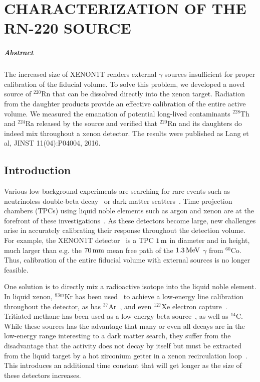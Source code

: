 
\chapter{CHARACTERIZATION OF THE RN-220 SOURCE}\label{ch:rn220}

\paragraph{Abstract} The increased size of XENON1T renders external $\gamma$ sources insufficient for proper calibration of the fiducial volume. To solve this problem, we developed a novel source of $^{220}$Rn that can be dissolved directly into the xenon target. Radiation from the daughter products provide an effective calibration of the entire active volume. We measured the emanation of potential long-lived contaminants $^{228}$Th and $^{224}$Ra released by the source and verified that $^{220}$Rn and its daughters do indeed mix throughout a xenon detector. The results were published as Lang et al, JINST 11(04):P04004, 2016.

\section{Introduction}

Various low-background experiments are searching for rare events such as neutrinoless double-beta decay~\cite{Pandola:2014naa} or dark matter scatters~\cite{Undagoitia:2015gya}. Time projection chambers (TPCs) using liquid noble elements such as argon and xenon are at the forefront of these investigations~\cite{Albert:2015eem,Aprile:2015uzo,Akerib:2015rjg,Amaudruz:2014nsa,Calvo:2015uln,Agnes:2015ftt}. As these detectors become large, new challenges arise in accurately calibrating their response throughout the detection volume. For example, the XENON1T detector~\cite{Aprile:2015uzo} is a TPC $1\,\mathrm{m}$ in diameter and in height, much larger than e.g. the $70\,\mathrm{mm}$ mean free path of the $1.3\,\mathrm{MeV}$ $\gamma$ from $^{60}$Co. Thus, calibration of the entire fiducial volume with external sources is no longer feasible.

One solution is to directly mix a radioactive isotope into the liquid noble element. In liquid xenon, $^{83m}$Kr has been used~\cite{Akerib:2017eql} to achieve a low-energy line calibration throughout the detector, as has $^{37}$Ar~\cite{Boulton:2017hub}, and even $^{127}$Xe electron capture~\cite{Akerib:2017hph}. Tritiated methane has been used as a low-energy beta source~\cite{Akerib:2015wdi}, as well as $^{14}$C. While these sources has the advantage that many or even all decays are in the low-energy range interesting to a dark matter search, they suffer from the disadvantage that the activity does not decay by itself but must be extracted from the liquid target by a hot zirconium getter in a xenon recirculation loop~\cite{Akerib:2015wdi}. This introduces an additional time constant that will get longer as the size of these detectors increases.


